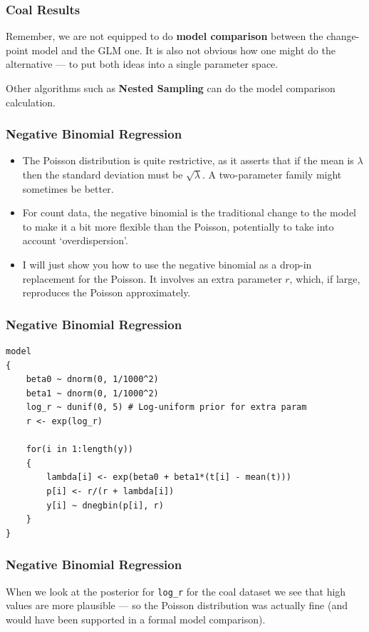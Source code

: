 \documentclass{beamer}
\begin{document}
\begin{frame}[fragile]
\frametitle{Coal Results}
Remember, we are not equipped to do {\bf model comparison} between the
change-point model and the GLM one. It is also not obvious how one might
do the alternative --- to put both ideas into a single parameter space.\\[0.5em]\pause

Other algorithms such as {\bf Nested Sampling} can do the model comparison
calculation.
\end{frame}


\begin{frame}
\frametitle{Negative Binomial Regression}
\begin{itemize}
\item The Poisson distribution is quite restrictive, as it asserts that if the
mean is $\lambda$ then the standard deviation must be $\sqrt{\lambda}$.
A two-parameter family might sometimes be better.\pause
\item For count data, the negative binomial is the traditional change to the
model to make it a bit more flexible than the Poisson, potentially to take
into account `overdispersion'.\pause
\item I will just show you how to use the negative binomial as a drop-in
replacement for the Poisson. It involves an extra parameter $r$, which,
if large, reproduces the Poisson approximately.
\end{itemize}

\end{frame}

\begin{frame}[fragile]
\frametitle{Negative Binomial Regression}
\footnotesize
\begin{verbatim}
model
{
    beta0 ~ dnorm(0, 1/1000^2)
    beta1 ~ dnorm(0, 1/1000^2)
    log_r ~ dunif(0, 5) # Log-uniform prior for extra param
    r <- exp(log_r)

    for(i in 1:length(y))
    {
        lambda[i] <- exp(beta0 + beta1*(t[i] - mean(t)))
        p[i] <- r/(r + lambda[i])
        y[i] ~ dnegbin(p[i], r)
    }
}
\end{verbatim}

\end{frame}

\begin{frame}[fragile]
\frametitle{Negative Binomial Regression}
When we look at the posterior for \texttt{log_r} for the coal dataset
we see that high values are more plausible --- so the Poisson distribution
was actually fine (and would have been supported in a formal model comparison).

\end{frame}
\end{document}
